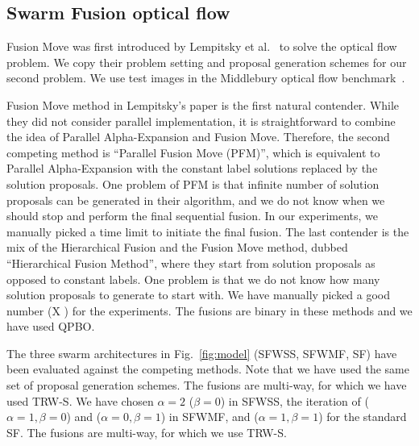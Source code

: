 \subsection{Swarm Fusion optical flow}

Fusion Move was first introduced by Lempitsky et al.~\cite{viktor} to
solve the optical flow problem.
We copy their problem setting and proposal generation schemes for our
second problem.  We use test images in the Middlebury optical flow
benchmark~\cite{middlebury_optical_flow}.

 Fusion Move method in Lempitsky's
paper is the first natural contender. While they did not consider
parallel implementation, it is straightforward to combine the idea of
Parallel Alpha-Expansion and Fusion Move. Therefore, the second competing
method is ``Parallel Fusion Move (PFM)'', which is equivalent to
Parallel Alpha-Expansion with the constant label solutions replaced by
the solution proposals.
%
One problem of PFM is that infinite number of solution proposals can be
generated in their algorithm, and we do not know when we should stop and
perform the final sequential fusion. In our experiments, we manually
picked a time limit to initiate the final fusion.
%
The last contender is the mix of the Hierarchical Fusion and the Fusion
Move method, dubbed ``Hierarchical Fusion Method'', where they start
from solution proposals as opposed to constant labels. One problem is
that we do not know how many solution proposals to generate to start
with. We have manually picked a good number (X )
for the experiments.
%
The fusions are binary in these methods and we have used QPBO.

The three swarm architectures in Fig.~\ref{fig:model} (SFWSS, SFWMF, SF)
have been evaluated against the competing methods. Note that we have
used the same set of proposal generation schemes. The fusions are
multi-way, for which we have used TRW-S.
We have chosen $\alpha=2$ ($\beta=0$) in SFWSS, the iteration of
($\alpha=1, \beta=0$) and ($\alpha=0, \beta=1$) in SFWMF, and
($\alpha=1, \beta=1$) for the standard SF.  The fusions are multi-way,
for which we use TRW-S.
